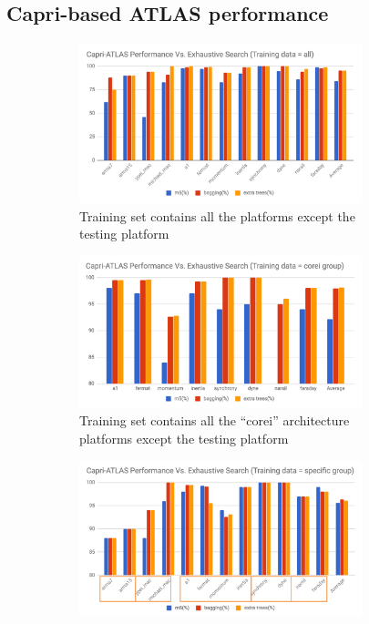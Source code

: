   \subsection{Capri-based ATLAS performance}
  \label{sec:capri_atlas_performance}

  \begin{figure}[tbhp]
    \centering
    \begin{subfigure}[b]{1.0\linewidth}
      \centering
      \includegraphics[width=0.9\textwidth]{images/all_perf.png}
      \caption{Training set contains all the platforms except the testing platform}
      \label{fig:all_perf}
    \end{subfigure}
    \begin{subfigure}[b]{1.0\linewidth}
      \centering
      \includegraphics[width=0.9\textwidth]{images/corei_perf.png}
      \caption{Training set contains all the ``corei'' architecture platforms except the testing platform}
      \label{fig:corei_perf}
    \end{subfigure}
    \begin{subfigure}[b]{1.0\linewidth}
      \centering
      \includegraphics[width=0.9\textwidth]{images/specific_perf.png}

\end{subfigure}
\end{figure}
